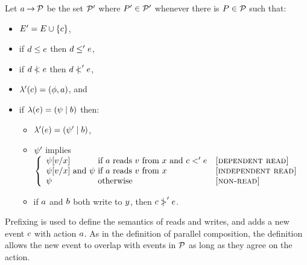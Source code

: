\begin{definition}
  \label{def:prefix}
Let $a \mathbin\rightarrow \mathcal{P}$ be the set $\mathcal{P}'$ where $P'\in\mathcal{P}'$ whenever
there is $P\in\mathcal{P}$ such that:
\begin{itemize}
\item $E' = E \cup \{c\}$,
\item if $d \le e$ then $d \le' e$,
\item if $d \mathrel{\,\mid\!\!\!<} e$ then $d \mathrel{\,\mid\!\!\!<}' e$,
\item $\lambda'(c) = (\phi, a)$, and
\item if $\lambda(e) = (\psi \mid b)$ then:
  \begin{itemize}
  \item $\lambda'(e) = (\psi' \mid b)$,
  \item $\psi'$ implies \(\left\{\begin{array}{l@{~}ll}
    \bForm[\aVal/\aLoc]                     & \mbox{if $\aAct$ reads $\aVal$ from $\aLoc$ and $\cEv<'\aEv$} & \textsc{[dependent read]} \\
    \bForm[\aVal/\aLoc] \text{ and } \bForm & \mbox{if $\aAct$ reads $\aVal$ from $\aLoc$}                  & \textsc{[independent read]} \\
    \bForm                                  & \mbox{otherwise}                                              & \textsc{[non-read]} \\
  \end{array}\right.\)
  \item if $a$ and $b$ both write to $y$,
    then $c \mathrel{\,\mid\!\!\!>}' e$.
  \end{itemize}
\end{itemize}
\end{definition}
Prefixing is used to define the semantics of reads and writes, and
adds a new event $c$ with action $a$.  As in the definition
of parallel composition, the definition allows the new event to overlap with
events in $\mathcal{P}$ as long as they agree on the action.

